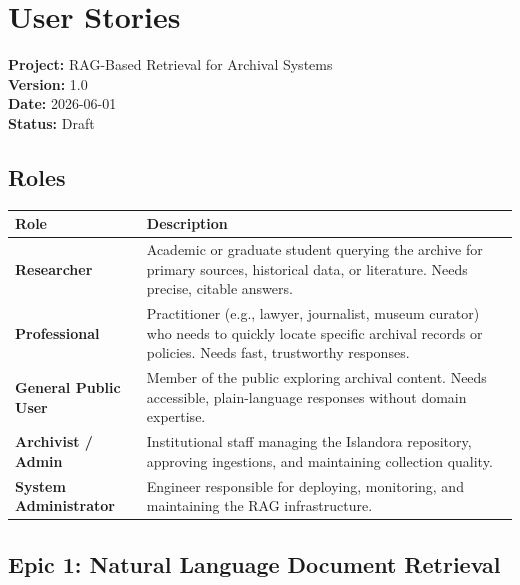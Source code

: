 \documentclass[
  11pt,
]{article}
\author{}
\date{}
\newcounter{none} %
\begin{document}
\section{User Stories}\label{user-stories}

\textbf{Project:} RAG-Based Retrieval for Archival Systems\\
\textbf{Version:} 1.0\\
\textbf{Date:} 2026-06-01\\
\textbf{Status:} Draft

\subsection{Roles}\label{roles}

{\def\LTcaptype{none} %
\begin{longtable}[]{@{}
  >{\raggedright\arraybackslash}p{}
  >{\raggedright\arraybackslash}p{}@{}}
\toprule\noalign{}
\begin{minipage}[b]{\linewidth}\raggedright
Role
\end{minipage} & \begin{minipage}[b]{\linewidth}\raggedright
Description
\end{minipage} \\
\midrule\noalign{}
\endhead
\bottomrule\noalign{}
\endlastfoot
\textbf{Researcher} & Academic or graduate student querying the archive
for primary sources, historical data, or literature. Needs precise,
citable answers. \\
\textbf{Professional} & Practitioner (e.g., lawyer, journalist, museum
curator) who needs to quickly locate specific archival records or
policies. Needs fast, trustworthy responses. \\
\textbf{General Public User} & Member of the public exploring archival
content. Needs accessible, plain-language responses without domain
expertise. \\
\textbf{Archivist / Admin} & Institutional staff managing the Islandora
repository, approving ingestions, and maintaining collection quality. \\
\textbf{System Administrator} & Engineer responsible for deploying,
monitoring, and maintaining the RAG infrastructure. \\
\end{longtable}
}

\subsection{Epic 1: Natural Language Document
Retrieval}\label{epic-1-natural-language-document-retrieval}
\end{document}
